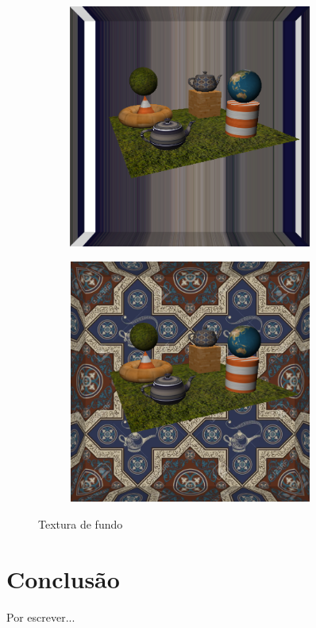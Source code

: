 \documentclass[11pt,a4paper]{report}
\begin{document}
\vspace{1cm}
\begin{figure}[H]
\centering
\begin{subfigure}{0.5\textwidth}
  \centering
  \includegraphics[width = 8cm,height = 8cm]{background_1.png}
  \caption{\texttt{}}
  \label{fig:background_1}
\end{subfigure}%
\begin{subfigure}{0.5\textwidth}
  \centering
  \includegraphics[width = 8cm,height = 8cm]{background_2.png}
  \caption{\texttt{}}
  \label{fig:background_2}
\end{subfigure}
\label{fig:texturas}
\caption{Textura de fundo}
\end{figure}




\newpage
\chapter{Conclusão}
Por escrever...
\end{document}
